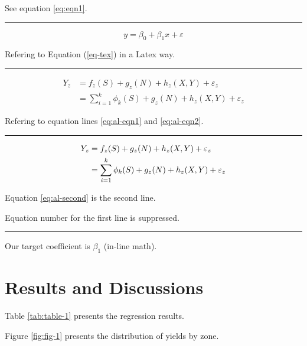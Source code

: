 \documentclass[
  12pt,
]{article}
\begin{document}
See equation \eqref{eq:eqn1}.

\begin{center}\rule{0.5\linewidth}{0.5pt}\end{center}

\begin{equation}
y = \beta_0 + \beta_1 x + \varepsilon \label{eq-tex}
\end{equation}

Refering to Equation (\ref{eq-tex}) in a Latex way.

\begin{center}\rule{0.5\linewidth}{0.5pt}\end{center}

\begin{align}
Y_z & = f_z(S) + g_z(N) + h_z(X,Y) + \varepsilon_z \label{eq:al-eqn1} \\
& = \sum_{i=1}^k \phi_k(S) + g_z(N) + h_z(X,Y) + \varepsilon_z \label{eq:al-eqn2}
\end{align}

Refering to equation lines \eqref{eq:al-eqn1} and \eqref{eq:al-eqn2}.

\begin{center}\rule{0.5\linewidth}{0.5pt}\end{center}

\begin{align}
Y_z & = f_z(S) + g_z(N) + h_z(X,Y) + \varepsilon_z \notag \\
& = \sum_{i=1}^k \phi_k(S) + g_z(N) + h_z(X,Y) + \varepsilon_z \label{eq:al-second}
\end{align}

Equation \eqref{eq:al-second} is the second line.

Equation number for the first line is suppressed.

\begin{center}\rule{0.5\linewidth}{0.5pt}\end{center}

Our target coefficient is \(\beta_1\) (in-line math).

\hypertarget{results-and-discussions}{%
\section{Results and Discussions}\label{results-and-discussions}}

Table \ref{tab:table-1} presents the regression results.

Figure \ref{fig:fig-1} presents the distribution of yields by zone.
\end{document}
